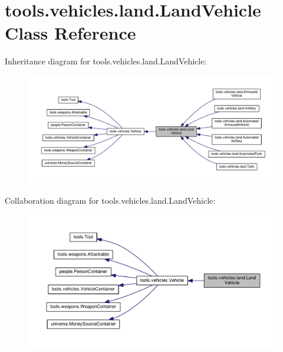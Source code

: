 \hypertarget{classtools_1_1vehicles_1_1land_1_1_land_vehicle}{}\section{tools.\+vehicles.\+land.\+Land\+Vehicle Class Reference}
\label{classtools_1_1vehicles_1_1land_1_1_land_vehicle}


Inheritance diagram for tools.\+vehicles.\+land.\+Land\+Vehicle\+:\nopagebreak
\begin{figure}[H]
\begin{center}
\leavevmode
\includegraphics[width=350pt]{classtools_1_1vehicles_1_1land_1_1_land_vehicle__inherit__graph}
\end{center}
\end{figure}


Collaboration diagram for tools.\+vehicles.\+land.\+Land\+Vehicle\+:\nopagebreak
\begin{figure}[H]
\begin{center}
\leavevmode
\includegraphics[width=350pt]{classtools_1_1vehicles_1_1land_1_1_land_vehicle__coll__graph}
\end{center}
\end{figure}
